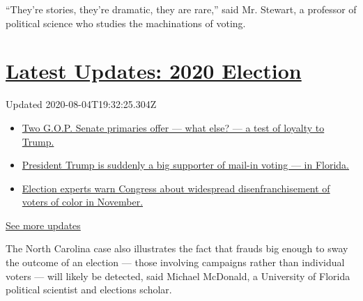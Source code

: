 ``They're stories, they're dramatic, they are rare,'' said Mr. Stewart,
a professor of political science who studies the machinations of voting.

\hypertarget{latest-updates-2020-election}{%
\section{\texorpdfstring{\href{https://www.nytimes3xbfgragh.onion/2020/08/04/us/elections/primary-election-michigan-arizona-kansas.html?action=click\&pgtype=Article\&state=default\&region=MAIN_CONTENT_1\&context=storylines_live_updates}{Latest
Updates: 2020
Election}}{Latest Updates: 2020 Election}}\label{latest-updates-2020-election}}

Updated 2020-08-04T19:32:25.304Z

\begin{itemize}
\tightlist
\item
  \href{https://www.nytimes3xbfgragh.onion/2020/08/04/us/elections/primary-election-michigan-arizona-kansas.html?action=click\&pgtype=Article\&state=default\&region=MAIN_CONTENT_1\&context=storylines_live_updates\#link-3924dd44}{Two
  G.O.P. Senate primaries offer --- what else? --- a test of loyalty to
  Trump.}
\item
  \href{https://www.nytimes3xbfgragh.onion/2020/08/04/us/elections/primary-election-michigan-arizona-kansas.html?action=click\&pgtype=Article\&state=default\&region=MAIN_CONTENT_1\&context=storylines_live_updates\#link-32b39e33}{President
  Trump is suddenly a big supporter of mail-in voting --- in Florida.}
\item
  \href{https://www.nytimes3xbfgragh.onion/2020/08/04/us/elections/primary-election-michigan-arizona-kansas.html?action=click\&pgtype=Article\&state=default\&region=MAIN_CONTENT_1\&context=storylines_live_updates\#link-6d019753}{Election
  experts warn Congress about widespread disenfranchisement of voters of
  color in November.}
\end{itemize}

\href{https://www.nytimes3xbfgragh.onion/2020/08/04/us/elections/primary-election-michigan-arizona-kansas.html?action=click\&pgtype=Article\&state=default\&region=MAIN_CONTENT_1\&context=storylines_live_updates}{See
more updates}

The North Carolina case also illustrates the fact that frauds big enough
to sway the outcome of an election --- those involving campaigns rather
than individual voters --- will likely be detected, said Michael
McDonald, a University of Florida political scientist and elections
scholar.

